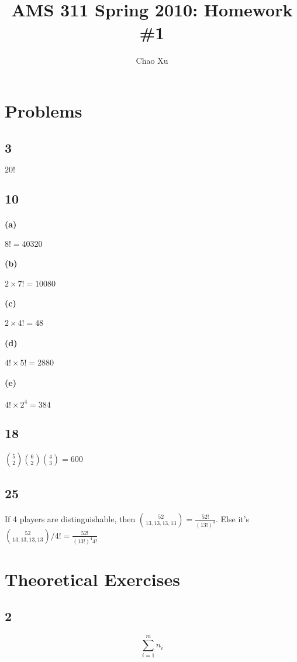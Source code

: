 \documentclass[letter]{article}
\author{Chao Xu}
\title{AMS 311 Spring 2010: Homework \#1}
\date{}
\begin{document}
\maketitle
\vspace{-.5in}
\section*{Problems}
\subsection*{3}
$20!$
\subsection*{10}
\paragraph*{(a)} $8!=40320$
\paragraph*{(b)} $2\times 7!= 10080$
\paragraph*{(c)} $2\times 4!=48$
\paragraph*{(d)} $4!\times 5!=2880$
\paragraph*{(e)} $4!\times 2^4 =384$
\subsection*{18}
${5 \choose 2} {6 \choose 2} {4 \choose 3}=600$
\subsection*{25}
If 4 players are distinguishable, then ${52 \choose 13,13,13,13} =
\frac{52!}{(13!)^4}$. Else it's ${52 \choose 13,13,13,13} / 4! =
\frac{52!}{(13!)^4 4!}$
\section*{Theoretical Exercises}
\subsection*{2}
\[
\sum_{i=1}^m n_i
\]
\end{document}
